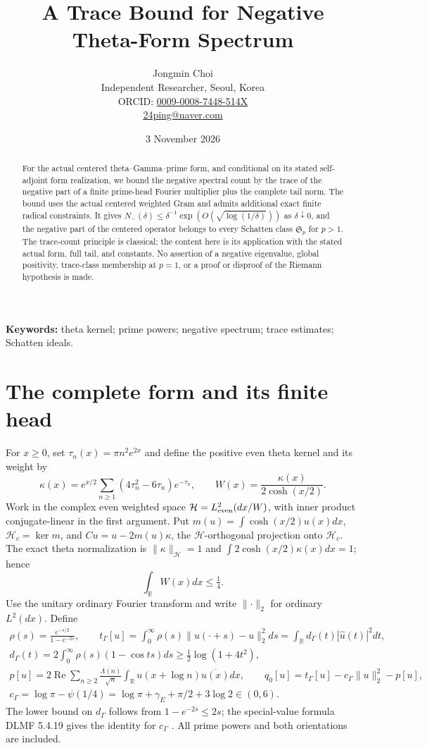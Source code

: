 \documentclass[11pt]{article}
\title{A Trace Bound for Negative Theta-Form Spectrum}
\author{Jongmin Choi\\\small Independent Researcher, Seoul, Korea\\\small ORCID: \href{https://orcid.org/0009-0008-7448-514X}{0009-0008-7448-514X}\\\small \href{mailto:24ping@naver.com}{24ping@naver.com}}
\date{3 November 2026}
\newcommand{\R}{\mathbb R}\newcommand{\Hh}{\mathcal H}\newcommand{\Nn}{\mathcal N}\newcommand{\norm}[1]{\lVert#1\rVert}\newcommand{\ip}[2]{\langle #1,#2\rangle}\newcommand{\dom}{\operatorname{Dom}}
\begin{document}
\maketitle
\begin{abstract}
For the actual centered theta--Gamma--prime form, and conditional on its stated self-adjoint form realization, we bound the negative spectral count by the trace of the negative part of a finite prime-head Fourier multiplier plus the complete tail norm. The bound uses the actual centered weighted Gram and admits additional exact finite radical constraints. It gives $N_-(\delta)\le\delta^{-1}\exp(O(\sqrt{\log(1/\delta)}))$ as $\delta\downarrow0$, and the negative part of the centered operator belongs to every Schatten class $\mathfrak S_p$ for $p>1$. The trace-count principle is classical; the content here is its application with the stated actual form, full tail, and constants. No assertion of a negative eigenvalue, global positivity, trace-class membership at $p=1$, or a proof or disproof of the Riemann hypothesis is made.
\end{abstract}
\noindent\textbf{Keywords:} theta kernel; prime powers; negative spectrum; trace estimates; Schatten ideals.

\section{The complete form and its finite head}\label{setting}
For $x\ge0$, set $\tau_n(x)=\pi n^2e^{2x}$ and define the positive even theta kernel and its weight by
\[\kappa(x)=e^{x/2}\sum_{n\ge1}(4\tau_n^2-6\tau_n)e^{-\tau_n},\qquad W(x)=\frac{\kappa(x)}{2\cosh(x/2)}.\]
Work in the complex even weighted space $\Hh=L^2_{\rm even}(dx/W)$, with inner product conjugate-linear in the first argument. Put $m(u)=\int\cosh(x/2)u(x)dx$, $\Hh_c=\ker m$, and $Cu=u-2m(u)\kappa$, the $\Hh$-orthogonal projection onto $\Hh_c$. The exact theta normalization is $\norm\kappa_{\Hh}=1$ and $\int 2\cosh(x/2)\kappa(x)dx=1$; hence
\begin{equation}\label{Wmass}
 \int_\R W(x)dx\le\tfrac14.
\end{equation}
Use the unitary ordinary Fourier transform and write $\norm\cdot_2$ for ordinary $L^2(dx)$. Define
\begin{gather*}
 \rho(s)=\frac{e^{-s/2}}{1-e^{-2s}},\qquad
 t_\Gamma[u]=\int_0^\infty\rho(s)\norm{u(\cdot+s)-u}_2^2ds
 =\int_\R d_\Gamma(t)|\widehat u(t)|^2dt,\\
 d_\Gamma(t)=2\int_0^\infty\rho(s)(1-\cos ts)ds\ge\tfrac12\log(1+4t^2),\\
 p[u]=2\operatorname{Re}\sum_{n\ge2}\frac{\Lambda(n)}{\sqrt n}\int_\R u(x+\log n)\overline{u(x)}dx,\qquad
 q_0[u]=t_\Gamma[u]-c_\Gamma\norm u_2^2-p[u],\\
 c_\Gamma=\log\pi-\psi(1/4)=\log\pi+\gamma_E+\pi/2+3\log2\in(0,6).
\end{gather*}
The lower bound on $d_\Gamma$ follows from $1-e^{-2s}\le2s$; the special-value formula DLMF 5.4.19 gives the identity for $c_\Gamma$ \cite{dlmf}. All prime powers and both orientations are included.
\end{document}
